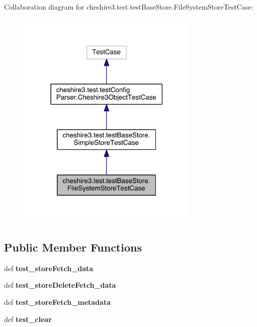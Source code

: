 Collaboration diagram for cheshire3.\-test.\-test\-Base\-Store.\-File\-System\-Store\-Test\-Case\-:
\nopagebreak
\begin{figure}[H]
\begin{center}
\leavevmode
\includegraphics[width=246pt]{classcheshire3_1_1test_1_1test_base_store_1_1_file_system_store_test_case__coll__graph}
\end{center}
\end{figure}
\subsection*{Public Member Functions}
\begin{DoxyCompactItemize}
\item 
\hypertarget{classcheshire3_1_1test_1_1test_base_store_1_1_file_system_store_test_case_acd782db8b8da4e2b679b6643b0493c07}{def {\bfseries test\-\_\-store\-Fetch\-\_\-data}}\label{classcheshire3_1_1test_1_1test_base_store_1_1_file_system_store_test_case_acd782db8b8da4e2b679b6643b0493c07}

\item 
\hypertarget{classcheshire3_1_1test_1_1test_base_store_1_1_file_system_store_test_case_a7236ba1ee311854fa7a1706ada6c3f44}{def {\bfseries test\-\_\-store\-Delete\-Fetch\-\_\-data}}\label{classcheshire3_1_1test_1_1test_base_store_1_1_file_system_store_test_case_a7236ba1ee311854fa7a1706ada6c3f44}

\item 
\hypertarget{classcheshire3_1_1test_1_1test_base_store_1_1_file_system_store_test_case_a014c21b9eeea3b48bdf5b4dba6ee3839}{def {\bfseries test\-\_\-store\-Fetch\-\_\-metadata}}\label{classcheshire3_1_1test_1_1test_base_store_1_1_file_system_store_test_case_a014c21b9eeea3b48bdf5b4dba6ee3839}

\item 
\hypertarget{classcheshire3_1_1test_1_1test_base_store_1_1_file_system_store_test_case_a4ed89837d70f4370b700e59944ed88c1}{def {\bfseries test\-\_\-clear}}\label{classcheshire3_1_1test_1_1test_base_store_1_1_file_system_store_test_case_a4ed89837d70f4370b700e59944ed88c1}

\end{DoxyCompactItemize}
